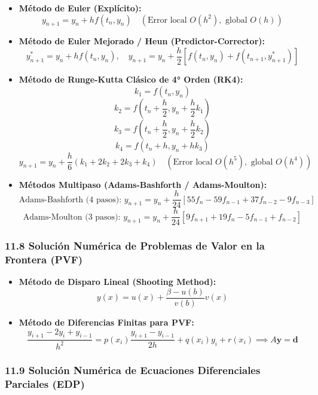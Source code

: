 \documentclass[11pt,a4paper]{article}
\begin{document}
\begin{itemize}
  \item \textbf{Método de Euler (Explícito):}
  \[
    y_{n+1} = y_n + h f(t_n, y_n) \quad (\text{Error local } O(h^2), \text{ global } O(h))
  \]
  \item \textbf{Método de Euler Mejorado / Heun (Predictor-Corrector):}
  \[
    y_{n+1}^* = y_n + h f(t_n, y_n), \quad y_{n+1} = y_n + \frac{h}{2}[f(t_n, y_n) + f(t_{n+1}, y_{n+1}^*)]
  \]
  \item \textbf{Método de Runge-Kutta Clásico de 4° Orden (RK4):}
  \[
    k_1 = f(t_n, y_n)
  \]
  \[
    k_2 = f\left(t_n + \frac{h}{2}, y_n + \frac{h}{2}k_1\right)
  \]
  \[
    k_3 = f\left(t_n + \frac{h}{2}, y_n + \frac{h}{2}k_2\right)
  \]
  \[
    k_4 = f(t_n + h, y_n + hk_3)
  \]
  \[
    y_{n+1} = y_n + \frac{h}{6}(k_1 + 2k_2 + 2k_3 + k_4) \quad (\text{Error local } O(h^5), \text{ global } O(h^4))
  \]
  \item \textbf{Métodos Multipaso (Adams-Bashforth / Adams-Moulton):}
  \[
    \text{Adams-Bashforth (4 pasos): } y_{n+1} = y_n + \frac{h}{24}[55f_n - 59f_{n-1} + 37f_{n-2} - 9f_{n-3}]
  \]
  \[
    \text{Adams-Moulton (3 pasos): } y_{n+1} = y_n + \frac{h}{24}[9f_{n+1} + 19f_n - 5f_{n-1} + f_{n-2}]
  \]
\end{itemize}

\subsubsection*{11.8 Solución Numérica de Problemas de Valor en la Frontera (PVF)}

\begin{itemize}
  \item \textbf{Método de Disparo Lineal (Shooting Method):}
  \[
    y(x) = u(x) + \frac{\beta - u(b)}{v(b)} v(x)
  \]
  \item \textbf{Método de Diferencias Finitas para PVF:}
  \[
    \frac{y_{i+1} - 2y_i + y_{i-1}}{h^2} = p(x_i)\frac{y_{i+1} - y_{i-1}}{2h} + q(x_i)y_i + r(x_i) \implies A\mathbf{y} = \mathbf{d}
  \]
\end{itemize}

\subsubsection*{11.9 Solución Numérica de Ecuaciones Diferenciales Parciales (EDP)}
\end{document}
